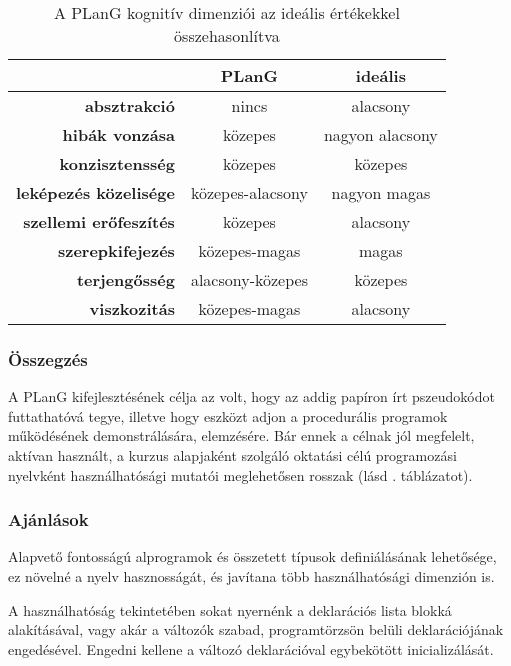 \begin{table}[tb]
	\centering
	\begin{tabular}{ r c c }
						& \bfseries PLanG	 & \bfseries ideális \\ \hline
		\bfseries absztrakció 		&\cellcolor{red!30}nincs & alacsony \\
		\bfseries hibák vonzása 	&\cellcolor{red!30}közepes & nagyon alacsony \\
		\bfseries konzisztensség 	&\cellcolor{green!30}közepes & közepes  \\
		\bfseries leképezés közelisége &\cellcolor{red!30}közepes-alacsony & nagyon magas \\
		\bfseries szellemi erőfeszítés &\cellcolor{red!30}közepes & alacsony \\
		\bfseries szerepkifejezés &\cellcolor{yellow!30}közepes-magas	& magas \\
		\bfseries terjengősség &\cellcolor{yellow!30}alacsony-közepes	& közepes \\
		\bfseries viszkozitás &\cellcolor{red!30}közepes-magas	& alacsony
	\end{tabular}
	\caption{A PLanG kognitív dimenziói az ideális értékekkel összehasonlítva}
	\label{tab:plangminmut}
\end{table}


\subsubsection{Összegzés}
A PLanG kifejlesztésének célja az volt, hogy az addig papíron írt pszeudokódot futtathatóvá tegye, illetve hogy eszközt adjon a procedurális programok működésének demonstrálására, elemzésére\cite{lovei}.
Bár ennek a célnak jól megfelelt, aktívan használt, a kurzus alapjaként szolgáló oktatási célú programozási nyelvként használhatósági mutatói meglehetősen rosszak (lásd . táblázatot).


\subsubsection{Ajánlások}
Alapvető fontosságú alprogramok és összetett típusok definiálásának lehetősége, ez növelné a nyelv hasznosságát, és javítana több használhatósági dimenzión is.

A használhatóság tekintetében sokat nyernénk a deklarációs lista blokká alakításával, vagy akár a változók szabad, programtörzsön belüli deklarációjának engedésével. Engedni kellene a változó deklarációval egybekötött inicializálását.

